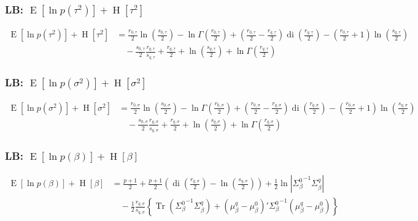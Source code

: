\documentclass[11pt]{article}
\DeclareMathOperator{\Tr}{Tr}
\newcommand{\opn}{\operatorname}
\begin{document}
\subsubsection{LB: $\opn{E}\left[\ln p\left(\tau^{2}\right)\right]+\opn{H}\left[\tau^{2}\right]$}
\begin{align*}
  \opn{E}\left[\ln p\left(\tau^{2}\right)\right]+\opn{H}\left[\tau^{2}\right] &= \frac{r_{0,\tau}}{2}\ln\left(\frac{s_{0,\tau}}{2}\right) - \ln\Gamma\left(\frac{r_{0,\tau}}{2}\right) + \left(\frac{r_{0,\tau}}{2} - \frac{r_{q,\tau}}{2}\right)\opn{di}\left(\frac{r_{q,\tau}}{2}\right) - \left(\frac{r_{0,\tau}}{2}+1\right)\ln\left(\frac{s_{q,\tau}}{2}\right)\\
  &\quad -\frac{s_{0,\tau}}{2}\frac{r_{q,\tau}}{s_{q,\tau}} + \frac{r_{q,\tau}}{2} + \ln\left(\frac{s_{q,\tau}}{2}\right) + \ln\Gamma\left(\frac{r_{q,\tau}}{2}\right)
\end{align*}
\subsubsection{LB: $\opn{E}\left[\ln p\left(\sigma^{2}\right)\right]+\opn{H}\left[\sigma^{2}\right]$}
\begin{align*}
  \opn{E}\left[\ln p\left(\sigma^{2}\right)\right]+\opn{H}\left[\sigma^{2}\right] &= \frac{r_{0,\sigma}}{2}\ln\left(\frac{s_{0,\sigma}}{2}\right) - \ln\Gamma\left(\frac{r_{0,\sigma}}{2}\right) + \left(\frac{r_{0,\sigma}}{2} - \frac{r_{q,\sigma}}{2}\right)\opn{di}\left(\frac{r_{q,\sigma}}{2}\right) - \left(\frac{r_{0,\sigma}}{2}+1\right)\ln\left(\frac{s_{q,\sigma}}{2}\right)\\
  &\quad -\frac{s_{0,\sigma}}{2}\frac{r_{q,\sigma}}{s_{q,\sigma}} + \frac{r_{q,\sigma}}{2} + \ln\left(\frac{s_{q,\sigma}}{2}\right) + \ln\Gamma\left(\frac{r_{q,\sigma}}{2}\right)
\end{align*}
\subsubsection{LB: $\opn{E}\left[\ln p\left(\beta\right)\right]+\opn{H}\left[\beta\right] $}
\begin{align*}
  \opn{E}\left[\ln p\left(\beta\right)\right]+\opn{H}\left[\beta\right] &= \frac{p+1}{2} +\frac{p+1}{2}\left(\opn{di}\left(\frac{r_{q,\sigma}}{2}\right)-\ln\left(\frac{s_{q,\sigma}}{2}\right)\right) +\frac{1}{2}\ln\left|{\Sigma_{\beta}^{0}}^{-1}\Sigma_{\beta}^{q}\right|\\
  &\quad -\frac{1}{2}\frac{r_{q,\sigma}}{s_{q,\sigma}}\left\{\Tr\left({\Sigma_{\beta}^{0}}^{-1}\Sigma_{\beta}^{q}\right)+\left(\mu_{\beta}^{q}-\mu_{\beta}^{0}\right)'{\Sigma_{\beta}^{0}}^{-1}\left(\mu_{\beta}^{q}-\mu_{\beta}^{0}\right) \right\}
\end{align*}
\end{document}
